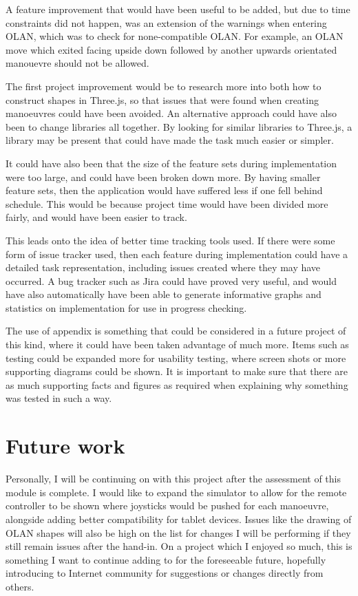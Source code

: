 A feature improvement that would have been useful to be added, but due to time constraints did not happen, was an extension of the warnings when entering OLAN, which was to check for none-compatible OLAN. For example, an OLAN move which exited facing upside down followed by another upwards orientated manouevre should not be allowed. 

The first project improvement would be to research more into both how to construct shapes in Three.js, so that issues that were found when creating manoeuvres could have been avoided. An alternative approach could have also been to change libraries all together. By looking for similar libraries to Three.js, a library may be present that could have made the task much easier or simpler. 

It could have also been that the size of the feature sets during implementation were too large, and could have been broken down more. By having smaller feature sets, then the application would have suffered less if one fell behind schedule. This would be because project time would have been divided more fairly, and would have been easier to track.

This leads onto the idea of better time tracking tools used. If there were some form of issue tracker used, then each feature during implementation could have a detailed task representation, including issues created where they may have occurred. A bug tracker such as Jira could have proved very useful, and would have also automatically have been able to generate informative graphs and statistics on implementation for use in progress checking.

The use of appendix is something that could be considered in a future project of this kind, where it could have been taken advantage of much more. Items such as testing could be expanded more for usability testing, where screen shots or more supporting diagrams could be shown. It is important to make sure that there are as much supporting facts and figures as required when explaining why something was tested in such a way.

\section{Future work}
Personally, I will be continuing on with this project after the assessment of this module is complete. I would like to expand the simulator to allow for the remote controller to be shown where joysticks would be pushed for each manoeuvre, alongside adding better compatibility for tablet devices. Issues like the drawing of OLAN shapes will also be high on the list for changes I will be performing if they still remain issues after the hand-in. On a project which I enjoyed so much, this is something I want to continue adding to for the foreseeable future, hopefully introducing to Internet community for suggestions or changes directly from others.

